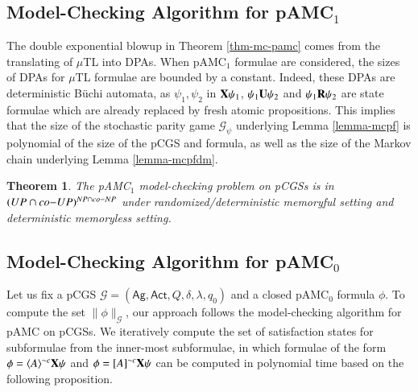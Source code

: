 \documentclass[letterpaper]{article}
\newcommand{\calM}{\mathcal{G}}
\newcommand{\Ag}{\textsf{Ag}}
\newcommand{\Act}{\textsf{Act}}
\newcommand{\pamc}{{pAMC}\xspace}
\newcommand{\pamcs}{{pAMC$_0$}\xspace}
\newcommand{\pamcc}{{pAMC$_1$}\xspace}
\newcommand{\opX}{{\bf X}}
\newcommand{\opU}{{\bf U}}
\newcommand{\opR}{{\bf R}}
\newcommand{\opA}[1]{\langle{#1}\rangle}
\newcommand{\opUA}[1]{[{#1}]}
\newcommand {\semantics}[1]{\|{#1}\|}  %
\newtheorem{theorem}{Theorem}
\begin{document}
\subsection{Model-Checking Algorithm for \pamcc}
The double exponential blowup in Theorem \ref{thm-mc-pamc} comes from the translating of $\mu$TL into DPAs. When \pamcc formulae are considered, the sizes of DPAs for $\mu$TL formulae are bounded by a constant. Indeed, these DPAs are deterministic B\"{u}chi automata, as $\psi_1,\psi_2$ in
$\opX \psi_1$, $\psi_1\opU\psi_2$ and $\psi_1\opR\psi_2$ are state formulae which are already replaced by fresh atomic propositions.
This implies that the size of the stochastic parity game $\calM_\psi$ underlying Lemma \ref{lemma-mcpf} is polynomial of the size of the pCGS and formula, as well as the size of the Markov chain underlying Lemma \ref{lemma-mcpfdm}.

\begin{theorem}
The \pamcc model-checking problem on pCGSs is in $({\sc UP\cap co{-}UP})^{{\sc NP\cap co{-}NP}}$ under \emph{randomized/deterministic memoryful} setting and \emph{deterministic memoryless} setting.
\end{theorem}




\subsection{Model-Checking Algorithm for \pamcs}
\label{sec:mc-simple}
Let us fix a pCGS $\calM=(\Ag,\Act, Q, \delta,\lambda,q_0)$ and a closed \pamcs formula $\phi$.
To compute the set $\semantics{\phi}_\calM$, our approach follows the model-checking algorithm for \pamc on pCGSs.
We iteratively compute the set of satisfaction states for subformulae from the inner-most subformulae, in which
formulae of the form $\phi=\opA{A}^{\sim c}\opX\psi$ and $\phi=\opUA{A}^{\sim c}\opX\psi$ can be computed in polynomial time based on the following proposition.
\end{document}
